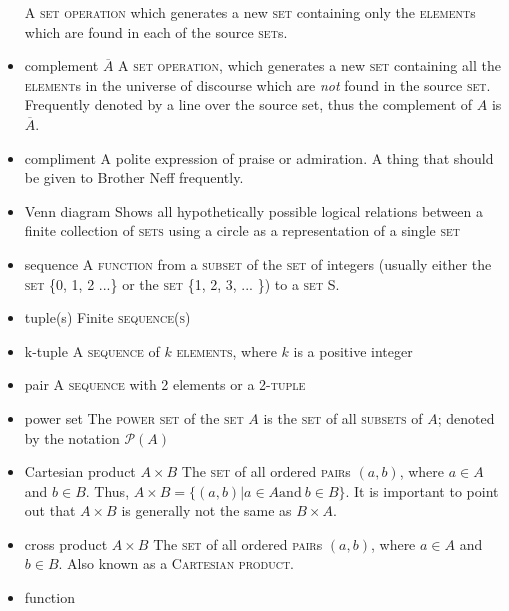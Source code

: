 \documentclass{article}
\newcommand{\term}[1]{\textsc{#1}}
\begin{document}
\begin{itemize}
  \subitem A \term{set operation} which generates a new \term{set} containing only the \term{element}s which are found in each of the source \term{set}s.
\item complement $\overline{A}$
  \subitem A \term{set operation}, which generates a new \term{set} containing all the \term{element}s in the universe of discourse which are \emph{not} found in the source \term{set}.  Frequently denoted by a line over the source set, thus the complement of $A$ is $\overline{A}$.
\item compliment
  \subitem A polite expression of praise or admiration. A thing that should be given to Brother Neff frequently. 
\item Venn diagram
  \subitem Shows all hypothetically possible logical relations between a finite collection of \term{sets} using a circle as a representation of a single \term{set}
\item sequence
  \subitem A \term{function} from a \term{subset} of the \term{set} of integers (usually either the \term{set} \{0, 1, 2 ...\} or the \term{set} \{1, 2, 3, ... \}) to a \term{set} S. 
\item tuple(s)
   \subitem Finite \term{sequence(s)}
\item k-tuple
   \subitem A \term{sequence} of $k$ \term{elements}, where $k$ is a positive integer
\item pair
   \subitem A \term{sequence} with 2 elements or a 2-\term{tuple}
\item power set 
  \subitem The \term{power set} of the \term{set} $A$ is the \term{set} of all \term{subsets} of $A$; denoted by the notation $\mathcal{P}\left(A\right)$
\item Cartesian product $A \times B$
  \subitem The \term{set} of all ordered \term{pair}s $(a, b)$, where $a \in A$ and $b \in B$. Thus, $A \times B = \{(a,b) | a\in A \text{and} \ b\in B\}$. It is important to point out that $A \times B$ is generally not the same as $B \times A$.
\item cross product $A \times B$
  \subitem The \term{set} of all ordered \term{pair}s $(a, b)$, where $a \in A$ and $b \in B$. Also known as a \term{Cartesian product}.
\item function

\end{itemize}
\end{document}
